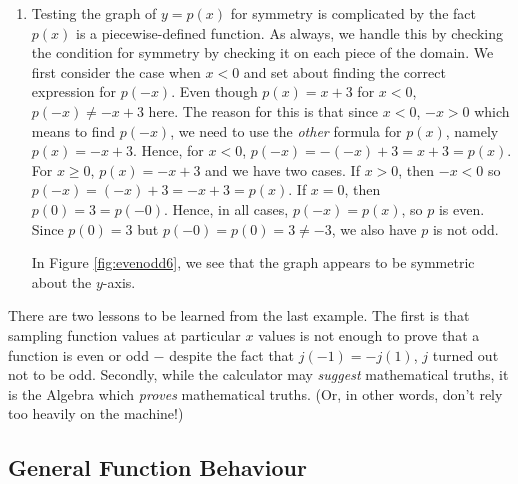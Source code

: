 {\begin{enumerate}

Notice in Figure \ref{fig:evenodd5} that the computer plot seems to suggests that the graph of $j$ is symmetric about the $y$-axis which would imply that $j$ is even. However, we have proven that is not the case.  The problem is that the effect of the $x/100$ term is so small, our eyes don't detect it in the graph.


\item Testing the graph of $y=p(x)$ for symmetry is complicated by the fact $p(x)$ is a piecewise-defined function.  As always, we handle this by checking the condition for symmetry by checking it on each piece of the domain.  We first consider the case when $x < 0$ and set about finding the correct expression for $p(-x)$.  Even though $p(x) = x+3$ for $x < 0$, $p(-x) \neq -x + 3$ here. The reason for this is that since $x < 0$, $-x > 0$ which means to find $p(-x)$, we need to use the \textit{other} formula for $p(x)$, namely $p(x) = -x+3$. Hence, for $x < 0$, $p(-x) = -(-x)+3 = x+3 = p(x)$.   For $x \geq 0$, $p(x) = -x+3$ and we have two cases.  If $x > 0$, then $-x < 0$ so $p(-x) = (-x)+3 = -x+3 = p(x)$.  If $x = 0$, then $p(0) = 3 = p(-0)$.  Hence, in all cases, $p(-x) = p(x)$, so $p$ is even. Since $p(0) = 3$ but $p(-0) = p(0) = 3 \neq -3$, we also have $p$ is not odd.  

 
In Figure \ref{fig:evenodd6}, we see that the graph appears to be symmetric about the $y$-axis. 

\end{enumerate}
}

\medskip

There are two lessons to be learned from the last example.  The first is that sampling function values at particular $x$ values is not enough to prove that a function is even or odd $-$ despite the fact that $j(-1) = - j(1)$, $j$ turned out not to be odd.  Secondly, while the calculator may \emph{suggest} mathematical truths, it is the Algebra which \emph{proves} mathematical truths. (Or, in other words, don't rely too heavily on the machine!)

\medskip

\subsection{General Function Behaviour}
\label{genfuncbehavior}


